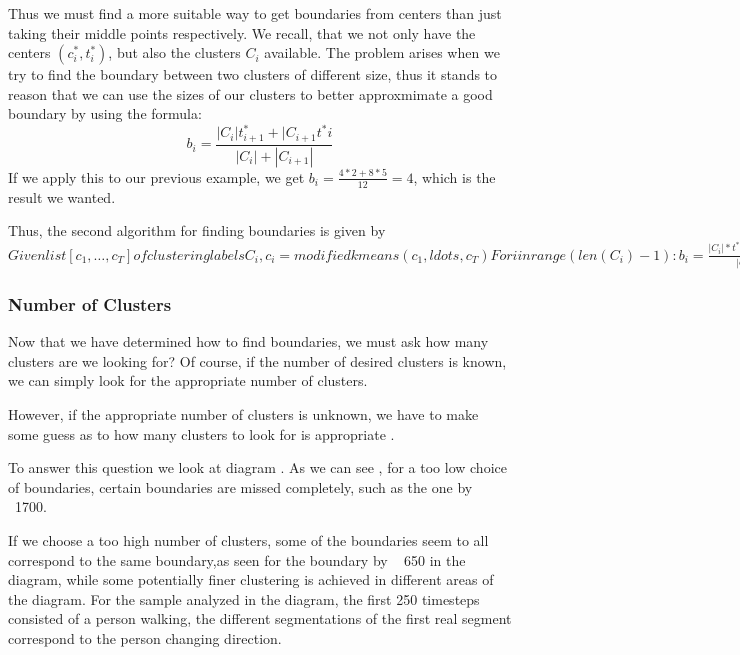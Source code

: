 Thus we must find a more suitable way to get boundaries from centers than just taking their middle points respectively.  We recall, that we not only have the centers $(c^*_i,t^*_i)$, but also the clusters $C_i$ available. The problem arises when we try to find the boundary between two clusters of different size, thus it stands to reason that we can use the sizes of our clusters to better approxmimate a good boundary by using the formula:
\[
b_i=\frac{|C_i|t^*_{i+1}+|C_{i+1}t^*{i}}{|C_i|+|C_{i+1}|}
\]
If we apply this to our previous example, we get $b_i=\frac{4*2+8*5}{12}=4$, which is the result we wanted.

Thus, the second algorithm for finding boundaries is given by
$Given list [c_1,\ldots,c_{T}] of clustering labels
C_i,c_i=modified kmeans (c_1,ldots,c_T)
For i in range(len(C_i)-1):
b_i=\frac{|C_i|*t^*{i+1}+|C_{i+1}|*t^*{i}}{|C_i|+|C_{i+1}|}$
\subsubsection{Number of Clusters}
Now that we have determined how to find boundaries, we must ask how many clusters are we looking for? Of course, if the number of desired clusters is known, we can simply look for the appropriate number of clusters.

However, if the appropriate number of clusters is unknown, we have to make some guess as to how many clusters to look for is appropriate . 

To answer this question we look at diagram  . As we can see
, for a too low choice of boundaries, certain boundaries are missed completely, such as the one by ~1700.

If we choose a too high number of clusters, some of the boundaries seem to all correspond to the same boundary,as seen for the boundary by ~ 650 in the diagram, while some potentially finer clustering is achieved in different areas of the diagram. For the sample analyzed in the diagram, the first 250 timesteps consisted of a person walking, the different segmentations of the first real segment correspond to the person changing direction. 

